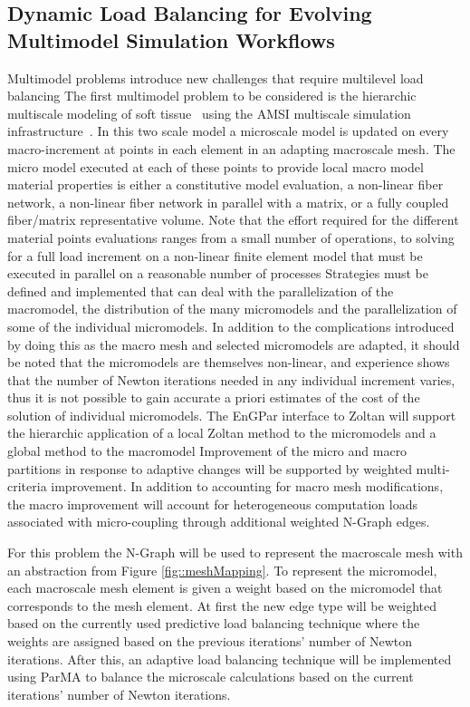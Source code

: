 \documentclass[12pt]{article}
\begin{document}
\subsection{Dynamic Load Balancing for Evolving Multimodel Simulation Workflows}
Multimodel problems introduce new challenges that require multilevel load
balancing The first multimodel problem to be considered is the hierarchic
multiscale modeling of soft tissue~\cite{luo07} using the AMSI multiscale
simulation infrastructure~\cite{del09}.
In this two scale model a microscale model is updated on every macro-increment
at points in each element in an adapting macroscale mesh.
The micro model executed at each of these points to provide local macro model
material properties is either a constitutive model evaluation, a non-linear
fiber network, a non-linear fiber network in parallel with a matrix, or a fully
coupled fiber/matrix representative volume.
Note that the effort required for the different material points evaluations
ranges from a small number of operations, to solving for a full load increment
on a non-linear finite element model that must be executed in parallel on a
reasonable number of processes Strategies must be defined and implemented that
can deal with the parallelization of the macromodel, the distribution of the
many micromodels and the parallelization of some of the individual micromodels.
In addition to the complications introduced by doing this as the macro mesh
and selected micromodels are adapted, it should be noted that the micromodels
are themselves non-linear, and experience shows that the number of Newton
iterations needed in any individual increment varies, thus it is not possible
to gain accurate a priori estimates of the cost of the solution of individual
micromodels.
The EnGPar interface to Zoltan will support the hierarchic application of a
local Zoltan method to the micromodels and a global method to the macromodel
Improvement of the micro and macro partitions in response to adaptive changes
will be supported by weighted multi-criteria improvement.
In addition to accounting for macro mesh modifications, the macro improvement
will account for heterogeneous computation loads associated with micro-coupling
through additional weighted N-Graph edges.

For this problem the N-Graph will be used to represent the macroscale mesh with 
an abstraction from Figure \ref{fig::meshMapping}. To represent the micromodel, 
each macroscale mesh element is given a weight based on the micromodel that
corresponds to the mesh element. At first the new edge type will be weighted 
based on the currently used predictive load balancing technique where the 
weights are assigned based on the previous iterations' number of Newton 
iterations. %
After this, an adaptive load balancing technique will be implemented using ParMA 
to balance the microscale calculations based on the current iterations' number
of Newton iterations.%
\end{document}
